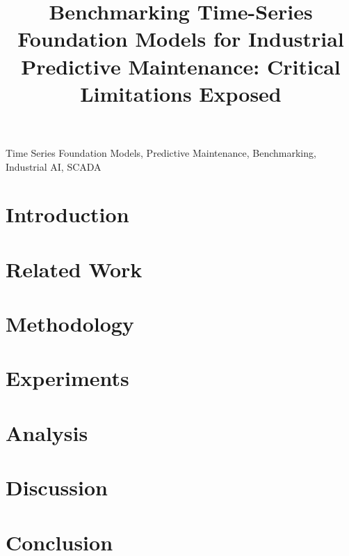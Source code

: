 \documentclass[conference]{IEEEtran}
\begin{document}
\title{Benchmarking Time-Series Foundation Models for Industrial Predictive Maintenance: Critical Limitations Exposed}

\author{
}

\maketitle

\begin{abstract}

\end{abstract}

\begin{IEEEkeywords}
Time Series Foundation Models, Predictive Maintenance, Benchmarking, Industrial AI, SCADA
\end{IEEEkeywords}

\section{Introduction}


\section{Related Work}


\section{Methodology}


\section{Experiments}


\section{Analysis}


\section{Discussion}


\section{Conclusion}




\end{document}
